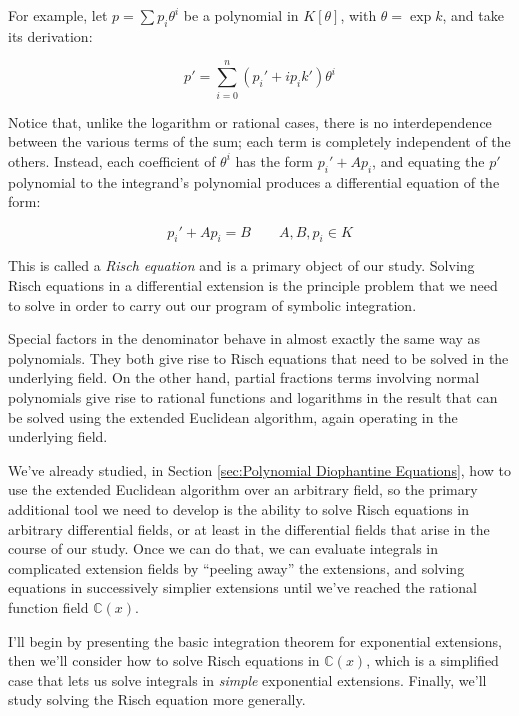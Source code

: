 \begin{comment}

t=tan x
t^2+1 = tan^2 x + 1 = sec^2 x
d(t^2+1) = 2tdt = 2 tan x sec^2 x

dt/dx = sec^2 x = (1 + tan^2 x)
Dt = t^2 + 1
D(t^2+1) = 2t(t^2+1)

\end{comment}

For example, let $p=\sum p_i \theta^i$ be a polynomial in $K[\theta]$,
with $\theta = \exp k$,
and take its derivation:

$$p' = \sum_{i=0}^n (p_i' + i p_i k') \theta^i$$

Notice that, unlike the logarithm or rational cases, there is no
interdependence between the various terms of the sum; each term is
completely independent of the others.  Instead, each coefficient of $\theta^i$ has
the form $p_i' + A p_i$, and equating the $p'$ polynomial to the
integrand's polynomial produces a differential equation of the form:

$$p_i' + A p_i = B \qquad A,B,p_i \in K$$

This is called a {\it Risch equation} and is a primary object of our
study.  Solving Risch equations in a differential extension is the
principle problem that we need to solve in order to carry out our
program of symbolic integration.

Special factors in the denominator behave in almost exactly the same
way as polynomials.  They both give rise to Risch equations that need
to be solved in the underlying field.  On the other hand, partial
fractions terms involving normal polynomials give rise to rational
functions and logarithms in the result that can be solved using the
extended Euclidean algorithm, again operating in the underlying field.

We've already studied, in Section \ref{sec:Polynomial Diophantine
Equations}, how to use the extended Euclidean algorithm over an
arbitrary field, so the primary additional tool we need to develop is
the ability to solve Risch equations in arbitrary differential fields,
or at least in the differential fields that arise in the course of our
study.  Once we can do that, we can evaluate integrals in complicated
extension fields by ``peeling away'' the extensions, and solving
equations in successively simplier extensions until we've reached the
rational function field ${\mathbb C}(x)$.

I'll begin by presenting the basic integration theorem for exponential
extensions, then we'll consider how to solve Risch equations
in ${\mathbb C}(x)$, which is a simplified case
that lets us solve integrals in
{\it simple} exponential extensions.  Finally, we'll study
solving the Risch equation more generally.

